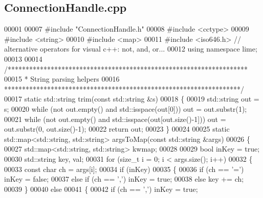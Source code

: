 \subsection{Connection\+Handle.\+cpp}
\label{ConnectionHandle_8cpp_source}

\begin{DoxyCode}
00001 
00007 \textcolor{preprocessor}{#include "ConnectionHandle.h"}
00008 \textcolor{preprocessor}{#include <cctype>}
00009 \textcolor{preprocessor}{#include <string>}
00010 \textcolor{preprocessor}{#include <map>}
00011 \textcolor{preprocessor}{#include <iso646.h>} \textcolor{comment}{// alternative operators for visual c++: not, and, or...}
00012 \textcolor{keyword}{using namespace }lime;
00013 
00014 \textcolor{comment}{/*******************************************************************}
00015 \textcolor{comment}{ * String parsing helpers}
00016 \textcolor{comment}{ ******************************************************************/}
00017 \textcolor{keyword}{static} std::string trim(\textcolor{keyword}{const} std::string &s)
00018 \{
00019     std::string out = s;
00020     \textcolor{keywordflow}{while} (not out.empty() and std::isspace(out[0])) out = out.substr(1);
00021     \textcolor{keywordflow}{while} (not out.empty() and std::isspace(out[out.size()-1])) out = out.substr(0, out.size()-1);
00022     \textcolor{keywordflow}{return} out;
00023 \}
00024 
00025 \textcolor{keyword}{static} std::map<std::string, std::string> argsToMap(\textcolor{keyword}{const} std::string &args)
00026 \{
00027     std::map<std::string, std::string> kwmap;
00028 
00029     \textcolor{keywordtype}{bool} inKey = \textcolor{keyword}{true};
00030     std::string key, val;
00031     \textcolor{keywordflow}{for} (\textcolor{keywordtype}{size\_t} i = 0; i < args.size(); i++)
00032     \{
00033         \textcolor{keyword}{const} \textcolor{keywordtype}{char} ch = args[i];
00034         \textcolor{keywordflow}{if} (inKey)
00035         \{
00036             \textcolor{keywordflow}{if} (ch == \textcolor{charliteral}{'='}) inKey = \textcolor{keyword}{false};
00037             \textcolor{keywordflow}{else} \textcolor{keywordflow}{if} (ch == \textcolor{charliteral}{','}) inKey = \textcolor{keyword}{true};
00038             \textcolor{keywordflow}{else} key += ch;
00039         \}
00040         \textcolor{keywordflow}{else}
00041         \{
00042             \textcolor{keywordflow}{if} (ch == \textcolor{charliteral}{','}) inKey = \textcolor{keyword}{true};

\end{DoxyCode}
